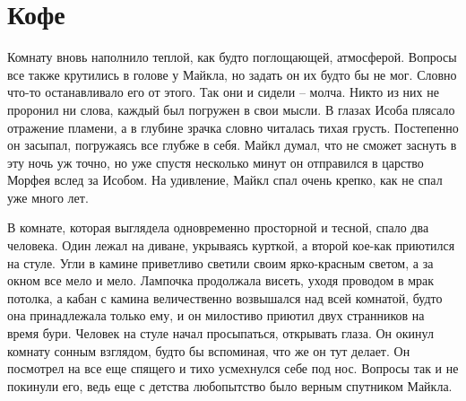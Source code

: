 \chapter{Кофе}
\lettrine{К}{}омнату вновь наполнило теплой, как будто поглощающей, атмосферой. Вопросы все также крутились в голове у Майкла, но задать он их будто бы не мог. Словно что-то останавливало его от этого. Так они и сидели – молча. Никто из них не проронил ни слова, каждый был погружен в свои мысли. В глазах Исоба плясало отражение пламени, а в глубине зрачка словно читалась тихая грусть. Постепенно он засыпал, погружаясь все глубже в себя. Майкл думал, что не сможет заснуть в эту ночь уж точно, но уже спустя несколько минут он отправился в царство Морфея вслед за Исобом. На удивление, Майкл спал очень крепко, как не спал уже много лет.

В комнате, которая выглядела одновременно просторной и тесной, спало два человека. Один лежал на диване, укрываясь курткой, а второй кое-как приютился на стуле. Угли в камине приветливо светили своим ярко-красным светом, а за окном все мело и мело. Лампочка продолжала висеть, уходя проводом в мрак потолка, а кабан с камина величественно возвышался над всей комнатой, будто она принадлежала только ему, и он милостиво приютил двух странников на время бури. Человек на стуле начал просыпаться, открывать глаза. Он окинул комнату сонным взглядом, будто бы вспоминая, что же он тут делает. Он посмотрел на все еще спящего и тихо усмехнулся себе под нос. Вопросы так и не покинули его, ведь еще с детства любопытство было верным спутником Майкла.

